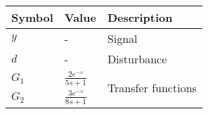 \begin{tabular} {|m{8ex}|m{8ex}|m{17ex}|}
    \hline
    \textbf{Symbol} & \textbf{Value} & \textbf{Description} \\[1.5ex]
    \hline
    $y$ & - & Signal  \\[1.5ex]
    \hline 
    $d$ & - & Disturbance \\[1.5ex]
    \hline
    $G_1$ & ${\frac{2e^{-s}}{5s+1}}$ & \multirow{2}{*}{Transfer functions} \\[2ex]
    \cline{1-2}
    $G_2$ & ${\frac{3e^{-s}}{8s+1}}$ & \\[2ex]
    \hline
\end{tabular}
